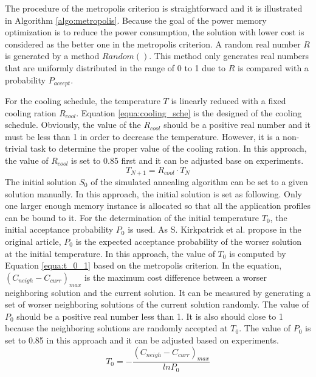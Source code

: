 	The procedure of the metropolis criterion is straightforward and it is
	illustrated in Algorithm \ref{algo:metropolis}. Because the goal of the
	power memory optimization is to reduce the power consumption, the solution
	with lower cost is considered as the better one in the metropolis criterion.
	A random real number $R$ is generated by a method $Random()$.
	This method only generates real numbers that are uniformly distributed in the
	range of 0 to 1 due to $R$ is compared with a probability $P_{accept}$.
	
	
	
	For the cooling schedule, the temperature $T$ is linearly reduced with a fixed
	cooling ration $R_{cool}$. Equation \ref{equa:cooling_sche} is the designed
	of the cooling schedule.
	Obviously, the value of the $R_{cool}$ should be
	a positive real number and it must be less than 1 in order to decrease the
	temperature. However, it is a non-trivial task to determine the proper value of
	the cooling ration. In this approach, the value of $R_{cool}$ is set to 0.85
	first and it can be adjusted base on experiments.
	\begin{equation}
	\label{equa:cooling_sche}
		T_{N+1}=R_{cool} \cdot T_{N}
	\end{equation}
	The initial solution $S_{0}$ of the simulated annealing algorithm can be set to a given
	solution manually. In this approach, the initial solution is set as following.
	Only one larger enough memory instance is allocated so that all the application
	profiles can be bound to it.
	For the determination of the initial temperature $T_{0}$, the initial acceptance
	probability $P_{0}$ is used. As S. Kirkpatrick et al. propose in the original article,
	$P_{0}$ is the expected acceptance probability of the worser solution at the initial temperature.
	In this approach, the value of $T_{0}$ is computed by Equation \ref{equa:t_0_1} based
	on the metropolis criterion. In the equation, $\left( C_{neigh}-C_{curr} \right)_{max}$
	is the maximum cost difference between a worser neighboring solution and the current
	solution. It can be measured by generating a set of worser neighboring solutions of the current solution randomly. The value of $P_{0}$ should be a positive real number
	less than 1. It is also should close to 1 because the neighboring solutions are randomly
	accepted at $T_{0}$. The value of $P_{0}$ is set to 0.85 in this approach and it can be
	adjusted based on experiments.
	\begin{equation}
	\label{equa:t_0_1}
		T_{0}= - \frac{\left( C_{neigh}-C_{curr} \right)_{max} }{ln{P_{0}}}
	\end{equation}	
